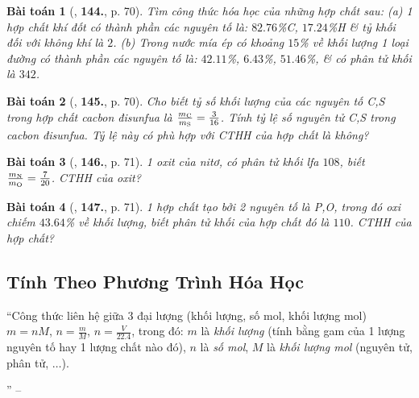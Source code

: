 \documentclass{article}
\numberwithin{equation}{section}
\newtheorem{baitoan}{Bài toán}
\begin{document}
\begin{baitoan}[\cite{An_400_BT_Hoa_Hoc_8_2020}, \textbf{144.}, p. 70]
	Tìm công thức hóa học của những hợp chất sau: (a) 1 hợp chất khí đốt có thành phần các nguyên tố là: $82.76$\%\emph{C}, $17.24$\%\emph{H} \& tỷ khối đối với không khí là $2$. (b) Trong nước mía ép có khoảng $15$\% về khối lượng 1 loại đường có thành phần các nguyên tố là: $42.11$\%, $6.43$\%, $51.46$\%, \& có phân tử khối là $342$.
\end{baitoan}

\begin{baitoan}[\cite{An_400_BT_Hoa_Hoc_8_2020}, \textbf{145.}, p. 70]
	Cho biết tỷ số khối lượng của các nguyên tố \emph{C,S} trong hợp chất cacbon đisunfua là $\frac{m_{\rm C}}{m_{\rm S}} = \frac{3}{16}$. Tính tỷ lệ số nguyên tử \emph{C,S} trong cacbon đisunfua. Tỷ lệ này có phù hợp với CTHH của hợp chất là \emph{} không?
\end{baitoan}

\begin{baitoan}[\cite{An_400_BT_Hoa_Hoc_8_2020}, \textbf{146.}, p. 71]
	1 oxit của nitơ, có phân tử khối lfa $108$, biết $\frac{m_{\rm N}}{m_{\rm O}} = \frac{7}{20}$. CTHH của oxit?
\end{baitoan}

\begin{baitoan}[\cite{An_400_BT_Hoa_Hoc_8_2020}, \textbf{147.}, p. 71]
	1 hợp chất tạo bởi 2 nguyên tố là \emph{P,O}, trong đó oxi chiếm $43.64$\% về khối lượng, biết phân tử khối của hợp chất đó là $110$. CTHH của hợp chất?
\end{baitoan}

\subsection{Tính Theo Phương Trình Hóa Học}
``Công thức liên hệ giữa 3 đại lượng (khối lượng, số mol, khối lượng mol) $m = nM$, $n = \frac{m}{M}$, $n = \frac{V}{22.4}$, trong đó: $m$ là \textit{khối lượng} (tính bằng gam của 1 lượng nguyên tố hay 1 lượng chất nào đó), $n$ là \textit{số mol}, $M$ là \textit{khối lượng mol} (nguyên tử, phân tử, $\ldots$).

'' -- \cite[p. 71]{An_400_BT_Hoa_Hoc_8_2020}


\printbibliography[heading=bibintoc]
	
\end{document}
